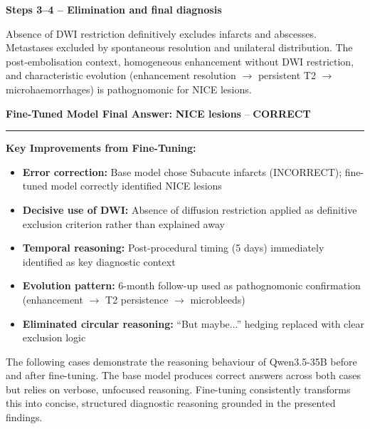 \documentclass[10pt,journal,compsoc, onecolumn]{IEEEtran}
\begin{document}
\begin{casebox}
    \vspace{0.5em}
    \noindent\textbf{Steps 3--4 -- Elimination and final diagnosis}

    \colorbox{yellow!30}{Absence of DWI restriction definitively excludes infarcts and abscesses}. Metastases excluded by spontaneous resolution and unilateral distribution. The post-embolisation context, homogeneous enhancement without DWI restriction, and \colorbox{yellow!30}{characteristic evolution (enhancement resolution $\to$ persistent T2 $\to$ microhaemorrhages)} is pathognomonic for NICE lesions.

    \vspace{1em}
    \noindent\textbf{Fine-Tuned Model Final Answer:} \colorbox{green!30}{\textbf{NICE lesions}} -- \textbf{CORRECT}

    \vspace{1em}
    \hrule
    \vspace{1em}

    \textbf{Key Improvements from Fine-Tuning:}
    \begin{itemize}[leftmargin=*, noitemsep, topsep=2pt]
        \item \textbf{Error correction:} Base model chose Subacute infarcts (INCORRECT); fine-tuned model correctly identified NICE lesions
        \item \textbf{Decisive use of DWI:} Absence of diffusion restriction applied as definitive exclusion criterion rather than explained away
        \item \textbf{Temporal reasoning:} Post-procedural timing (5 days) immediately identified as key diagnostic context
        \item \textbf{Evolution pattern:} 6-month follow-up used as pathognomonic confirmation (enhancement $\to$ T2 persistence $\to$ microbleeds)
        \item \textbf{Eliminated circular reasoning:} ``But maybe...'' hedging replaced with clear exclusion logic
    \end{itemize}
\end{casebox}

\vspace{1em}

The following cases demonstrate the reasoning behaviour of Qwen3.5-35B before and after fine-tuning. The base model produces correct answers across both cases but relies on verbose, unfocused reasoning. Fine-tuning consistently transforms this into concise, structured diagnostic reasoning grounded in the presented findings.
\end{document}
